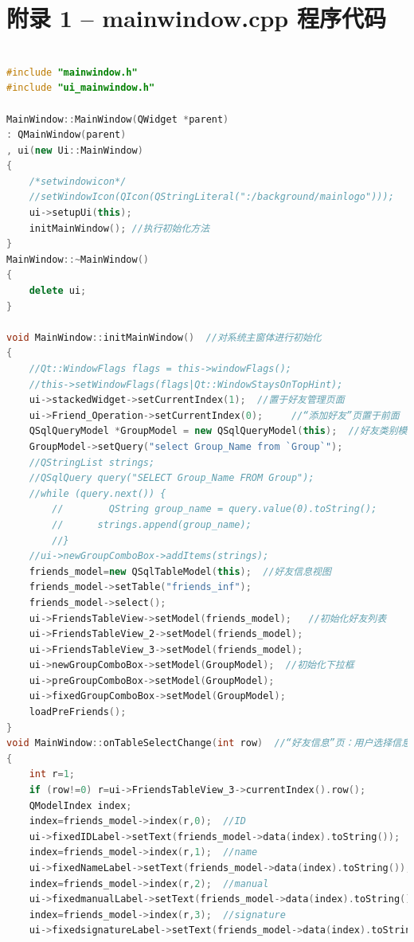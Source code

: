 \documentclass{progartcn}
\begin{document}
\appendix
\section{附录 1 -- mainwindow.cpp 程序代码 }

\begin{lstlisting}[language=c++]

#include "mainwindow.h"
#include "ui_mainwindow.h"

MainWindow::MainWindow(QWidget *parent)
: QMainWindow(parent)
, ui(new Ui::MainWindow)
{
	/*setwindowicon*/
	//setWindowIcon(QIcon(QStringLiteral(":/background/mainlogo")));
	ui->setupUi(this);
	initMainWindow(); //执行初始化方法
}
MainWindow::~MainWindow()
{
	delete ui;
}

void MainWindow::initMainWindow()  //对系统主窗体进行初始化
{
	//Qt::WindowFlags flags = this->windowFlags();
	//this->setWindowFlags(flags|Qt::WindowStaysOnTopHint);
	ui->stackedWidget->setCurrentIndex(1);  //置于好友管理页面
	ui->Friend_Operation->setCurrentIndex(0);     //“添加好友”页置于前面
	QSqlQueryModel *GroupModel = new QSqlQueryModel(this);  //好友类别模型数据
	GroupModel->setQuery("select Group_Name from `Group`");
	//QStringList strings;
	//QSqlQuery query("SELECT Group_Name FROM Group");
	//while (query.next()) {
		//        QString group_name = query.value(0).toString();
		//      strings.append(group_name);
		//}
	//ui->newGroupComboBox->addItems(strings);
	friends_model=new QSqlTableModel(this);  //好友信息视图
	friends_model->setTable("friends_inf");
	friends_model->select();
	ui->FriendsTableView->setModel(friends_model);   //初始化好友列表
	ui->FriendsTableView_2->setModel(friends_model);
	ui->FriendsTableView_3->setModel(friends_model);
	ui->newGroupComboBox->setModel(GroupModel);  //初始化下拉框
	ui->preGroupComboBox->setModel(GroupModel);
	ui->fixedGroupComboBox->setModel(GroupModel);
	loadPreFriends();
}
void MainWindow::onTableSelectChange(int row)  //“好友信息”页：用户选择信息时进行表单更新
{
	int r=1;
	if (row!=0) r=ui->FriendsTableView_3->currentIndex().row();
	QModelIndex index;
	index=friends_model->index(r,0);  //ID
	ui->fixedIDLabel->setText(friends_model->data(index).toString());
	index=friends_model->index(r,1);  //name
	ui->fixedNameLabel->setText(friends_model->data(index).toString());
	index=friends_model->index(r,2);  //manual
	ui->fixedmanualLabel->setText(friends_model->data(index).toString());
	index=friends_model->index(r,3);  //signature
	ui->fixedsignatureLabel->setText(friends_model->data(index).toString());

\end{lstlisting}
\end{document}
